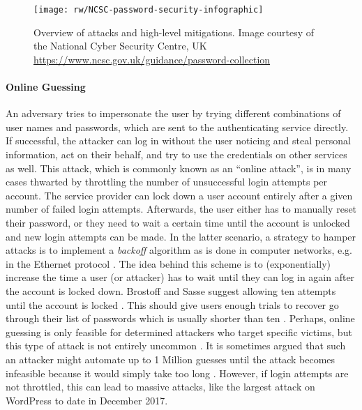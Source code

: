 \begin{figure}[h!]
	\centering
	\texttt{[image: rw/NCSC-password-security-infographic]}
	\caption{
		\label{fig:rw:attacks_infographic}
		Overview of attacks and high-level mitigations. Image courtesy of the National Cyber Security Centre, UK \protect\url{https://www.ncsc.gov.uk/guidance/password-collection} \protect{}
	}
\end{figure}


\paragraph{Online Guessing} 
An adversary tries to impersonate the user by trying different combinations of user names and passwords, which are sent to the authenticating service directly. If successful, the attacker can log in without the user noticing and steal personal information, act on their behalf, and try to use the credentials on other services as well. 
This attack, which is commonly known as an ``online attack'', is in many cases thwarted by throttling the number of unsuccessful login attempts per account. The service provider can lock down a user account entirely after a given number of failed login attempts. Afterwards, the user either has to manually reset their password, or they need to wait a certain time until the account is unlocked and new login attempts can be made. In the latter scenario, a strategy to hamper attacks is to implement a \textit{backoff} algorithm as is done in computer networks, e.g. in the Ethernet protocol \cite[p. 285]{Tanenbaum2011ComputerNetworks}. The idea behind this scheme is to (exponentially) increase the time a user (or attacker) has to wait until they can log in again after the account is locked down. Brostoff and Sasse suggest allowing ten attempts until the account is locked \cite{Brostoff2003TenStrikes}. This should give users enough trials to recover go through their list of passwords which is usually shorter than ten \cite{Florencio2007LargeScaleStudyPasswordHabits}. 
Perhaps, online guessing is only feasible for determined attackers who target specific victims, but this type of attack is not entirely uncommon \cite{Florencio2013WhereDoAllTheAttacksGo, Florencio2014PasswordPortfoliosFiniteUser, Herley2015Counterfactuals, Wang2016TargetedGuessingUnderestimated}. It is sometimes argued that such an attacker might automate up to 1 Million guesses until the attack becomes infeasible because it would simply take too long \cite{Bonneau2015ImperfectAuthentication, Florencio2014AdministratorsGuide}. However, if login attempts are not throttled, this can lead to massive attacks, like the largest attack on WordPress to date in December 2017. 
